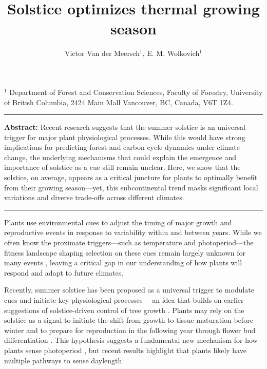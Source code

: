 \documentclass[11pt,letter]{article}
\begin{document}
\title{Solstice optimizes thermal growing season}

\author{Victor Van der Meersch$^{1}$, E. M. Wolkovich$^{1}$}
\date{}
\maketitle 

$^1$ Department of Forest and Conservation Sciences, Faculty of Forestry, University of British Columbia, 2424 Main Mall
Vancouver, BC, Canada, V6T 1Z4. \\

\noindent\rule{\textwidth}{0.3pt}
\textbf{Abstract:} Recent research suggests that the summer solstice is an universal trigger for major plant physiological processes. While this would have strong implications for predicting forest and carbon cycle dynamics under climate change, the underlying mechanisms that could explain the emergence and importance of solstice as a cue still remain unclear. Here, we show that the solstice, on average, appears as a critical juncture for plants to optimally benefit from their growing season---yet, this subcontinental trend masks significant local variations and diverse trade-offs across different climates.\\
\noindent\rule{\textwidth}{0.3pt}

\vspace{0.4cm}

Plants use environmental cues to adjust the timing of major growth and reproductive events in response to variability within and between years. While we often know the proximate triggers---such as temperature and photoperiod---the fitness landscape shaping selection on these cues remain largely unknown for many events \citep{Chuine2017}, leaving a critical gap in our understanding of how plants will respond and adapt to future climates.

Recently, summer solstice has been proposed as a universal trigger to modulate cues and initiate key physiological processes \citep{Zohner2023, Journe2024}---an idea that builds on earlier suggestions of solstice-driven control of tree growth \citep{Rossi2006}. 
Plants may rely on the solstice as a signal to initiate the shift from growth to tissue maturation before winter and to prepare for reproduction in the following year through flower bud differentiation \citep{Rossi2006, Zohner2023, Journe2024}. This hypothesis suggests a fundamental new mechanism for how plants sense photoperiod \citep{Gendron2023}, but recent results highlight that plants likely have multiple pathways to sense daylength  \citep{wang2024plants} 
\end{document}
